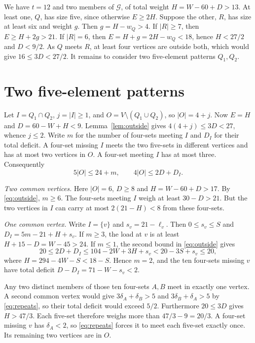 \documentclass[11pt]{article}
\newcommand{\G}{\mathcal G}
\begin{document}
We have \(t=12\) and two members of \(\G\), of total weight
\(H=W-60+D>13\). At least one, \(Q\), has size five, since otherwise
\(E\ge2H\). Suppose the other, \(R\), has size at least six and weight
\(g\). Then \(g=H-w_Q>4\). If \(|R|\ge7\), then \(E\ge H+2g>21\).
If \(|R|=6\), then \(E=H+g=2H-w_Q<18\), hence \(H<27/2\) and
\(D<9/2\). As \(Q\) meets \(R\), at least four vertices are outside
both, which would give \(16\le 3D<27/2\).
It remains to consider two five-element patterns \(Q_1,Q_2\).

\section{Two five-element patterns}
Let \(I=Q_1\cap Q_2\), \(j=|I|\ge1\), and \(O=V\setminus(Q_1\cup Q_2)\),
so \(|O|=4+j\). Now \(E=H\) and \(D=60-W+H<9\).
Lemma~\ref{lem:outside} gives \(4(4+j)\le3D<27\), whence \(j\le2\).
Write \(m\) for the number of four-sets meeting \(I\) and \(D_I\)
for their total deficit. A four-set missing \(I\) meets the two
five-sets in different vertices and has at most two vertices in \(O\).
A four-set meeting \(I\) has at most three. Consequently
\begin{equation}\label{eq:outside}
 5|O|\le 24+m,\qquad 4|O|\le2D+D_I .
\end{equation}

\emph{Two common vertices.}
Here \(|O|=6\), \(D\ge8\) and \(H=W-60+D>17\). By
\eqref{eq:outside}, \(m\ge6\). The four-sets meeting \(I\) weigh at
least \(30-D>21\). But the two vertices in \(I\) can carry at most
\(2(21-H)<8\) from these four-sets.

\emph{One common vertex.}
Write \(I=\{v\}\) and \(s_v=21-\ell_v\). Then \(0\le s_v\le S\) and
\(D_I=5m-21+H+s_v\). If \(m\ge3\), the load at \(v\) is at least
\(H+15-D=W-45>24\). If \(m\le1\), the second bound in
\eqref{eq:outside} gives
\[
20\le2D+D_I\le104-2W+3H+s_v
 <20-3S+s_v\le20,
\]
where \(H=294-4W-S<18-S\). Hence \(m=2\), and the ten four-sets
missing \(v\) have total deficit \(D-D_I=71-W-s_v<2\).

Any two distinct members of those ten four-sets \(A,B\) meet in exactly one vertex. A
second common vertex would give \(3\delta_A+\delta_B>5\) and
\(3\delta_B+\delta_A>5\) by \eqref{eq:repeats}, so their total deficit
would exceed \(5/2\). Furthermore \(20\le3D\) gives \(H>47/3\).
Each five-set therefore weighs more than \(47/3-9=20/3\). A four-set
missing \(v\) has \(\delta_A<2\), so \eqref{eq:repeats} forces it to
meet each five-set exactly once. Its remaining two vertices are in \(O\).
\end{document}
